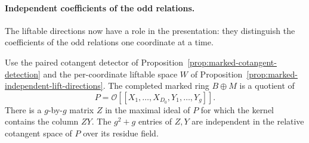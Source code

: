 \paragraph{Independent coefficients of the odd relations.}
The liftable directions now have a role in the presentation: they distinguish the
coefficients of the odd relations one coordinate at a time.

\begin{proposition}\label{prop:marked-cotangent-presentation}
Use the paired cotangent detector of
Proposition~\ref{prop:marked-cotangent-detection} and the
per-coordinate liftable space \(W\) of
Proposition~\ref{prop:marked-independent-lift-directions}.
The completed marked ring \(B\oplus M\) is a quotient of
\[
 P=\mathcal O[[X_1,\ldots,X_{D_0},Y_1,\ldots,Y_g]] .
\]
There is a \(g\)-by-\(g\) matrix \(Z\) in the maximal ideal
of \(P\) for which the kernel contains the column \(ZY\).
The \(g^2+g\) entries of \(Z,Y\) are independent in the
relative cotangent space of \(P\) over its residue field.
\end{proposition}

